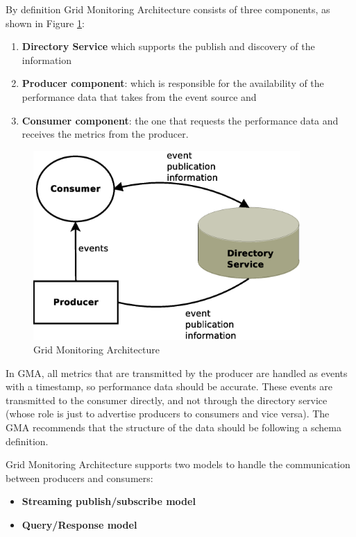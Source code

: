By definition \cite{Taylor2006} Grid Monitoring Architecture consists of three components, as shown in Figure \ref{figure:gma}:

\begin{enumerate}
\item {\bf Directory Service} which supports the publish and discovery of the information
\item {\bf Producer component}: which is responsible for the availability of the performance data that takes from the event source and
\item {\bf Consumer component}: the one that requests the performance data and receives the metrics from the producer.
\end{enumerate}

\begin{figure}[htb]
\centering
 \includegraphics[width=4in]{images/gma.eps}
\caption{Grid Monitoring Architecture}
\label{figure:gma}
\end{figure}

In GMA, all metrics that are transmitted by the producer are handled as events with a timestamp, so performance data should be accurate. These events are transmitted to the consumer directly, and not through the directory service (whose role is just to advertise producers to consumers and vice versa). The GMA recommends that the structure of the data should be following a schema definition. 

Grid Monitoring Architecture supports two models to handle the communication between producers and consumers:

\begin{itemize}
\item {\bf Streaming publish/subscribe model}
\item {\bf Query/Response model}
\end{itemize}

